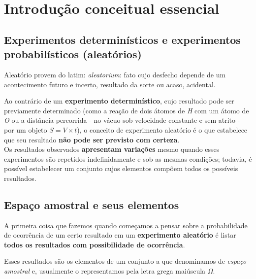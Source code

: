 \documentclass[
]{book}
\begin{document}
\hypertarget{introduuxe7uxe3o-conceitual-essencial-1}{%
\section{Introdução conceitual essencial}\label{introduuxe7uxe3o-conceitual-essencial-1}}

\hypertarget{experimentos-determinuxedsticos-e-experimentos-probabiluxedsticos-aleatuxf3rios}{%
\subsection{Experimentos determinísticos e experimentos probabilísticos (aleatórios)}\label{experimentos-determinuxedsticos-e-experimentos-probabiluxedsticos-aleatuxf3rios}}

Aleatório provem do latim: \emph{aleatorium}: fato cujo desfecho depende de um acontecimento futuro e incerto, resultado da sorte ou acaso, acidental.

\hfill\break

Ao contrário de um \textbf{experimento determinístico}, cujo resultado pode ser previamente determinado (como a reação de dois átomos de \emph{H} com um átomo de \emph{O} ou a distância percorrida - no vácuo sob velocidade constante e sem atrito - por um objeto \(S = V \times t\)), o conceito de experimento aleatório é o que estabelece que seu resultado \textbf{não pode ser previsto com certeza}.\\

Os resultados observados \textbf{apresentam variações} mesmo quando esses experimentos são repetidos indefinidamente e sob as mesmas condições; todavia, é possível estabelecer um conjunto cujos elementos compõem todos os possíveis resultados.

\hfill\break

\hypertarget{espauxe7o-amostral-e-seus-elementos}{%
\subsection{Espaço amostral e seus elementos}\label{espauxe7o-amostral-e-seus-elementos}}

A primeira coisa que fazemos quando começamos a pensar sobre a probabilidade de ocorrência de um certo resultado em um \textbf{experimento aleatório} é listar \textbf{todos os resultados com possibilidade de ocorrência}.

\hfill\break

Esses resultados são os elementos de um conjunto a que denominamos de \emph{espaço amostral} e, usualmente o representamos pela letra grega maiúscula \(\Omega\).
\end{document}
